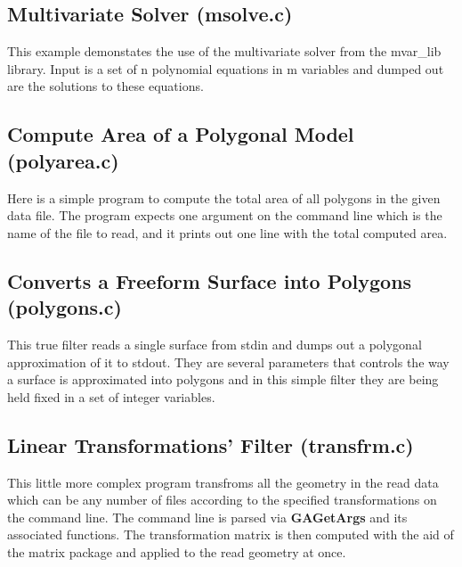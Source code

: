 {

\subsection{Multivariate Solver (msolve.c)}

This example demonstates the use of the multivariate solver from the
mvar\_lib library.  Input is a set of n polynomial equations in m
variables and dumped out are the solutions to these equations.



\subsection{Compute Area of a Polygonal Model (polyarea.c)}

Here is a simple program to compute the total area of all polygons in
the given data file. The program expects one argument on the command
line which is the name of the file to read, and it prints out one
line with the total computed area.



\subsection{Converts a Freeform Surface into Polygons (polygons.c)}

This true filter reads a single surface from stdin and dumps out a
polygonal approximation of it to stdout. They are several parameters
that controls the way a surface is approximated into polygons and in
this simple filter they are being held fixed in a set of integer
variables.



\subsection{Linear Transformations' Filter (transfrm.c)}

This little more complex program transfroms all the geometry in the
read data which can be any number of files according to the specified
transformations on the command line. The command line is parsed via
{\bf GAGetArgs} and its associated functions. The transformation
matrix is then computed with the aid of the matrix package and applied
to the read geometry at once.



}
